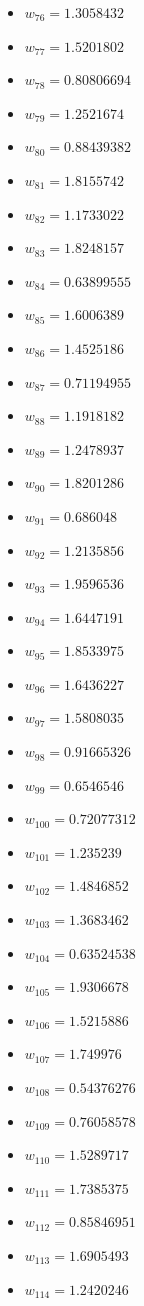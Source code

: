 \documentclass[11pt]{article}
\begin{document}
\begin{itemize}
\item $w_{76} = 1.3058432$
\item $w_{77} = 1.5201802$
\item $w_{78} = 0.80806694$
\item $w_{79} = 1.2521674$
\item $w_{80} = 0.88439382$
\item $w_{81} = 1.8155742$
\item $w_{82} = 1.1733022$
\item $w_{83} = 1.8248157$
\item $w_{84} = 0.63899555$
\item $w_{85} = 1.6006389$
\item $w_{86} = 1.4525186$
\item $w_{87} = 0.71194955$
\item $w_{88} = 1.1918182$
\item $w_{89} = 1.2478937$
\item $w_{90} = 1.8201286$
\item $w_{91} = 0.686048$
\item $w_{92} = 1.2135856$
\item $w_{93} = 1.9596536$
\item $w_{94} = 1.6447191$
\item $w_{95} = 1.8533975$
\item $w_{96} = 1.6436227$
\item $w_{97} = 1.5808035$
\item $w_{98} = 0.91665326$
\item $w_{99} = 0.6546546$
\item $w_{100} = 0.72077312$
\item $w_{101} = 1.235239$
\item $w_{102} = 1.4846852$
\item $w_{103} = 1.3683462$
\item $w_{104} = 0.63524538$
\item $w_{105} = 1.9306678$
\item $w_{106} = 1.5215886$
\item $w_{107} = 1.749976$
\item $w_{108} = 0.54376276$
\item $w_{109} = 0.76058578$
\item $w_{110} = 1.5289717$
\item $w_{111} = 1.7385375$
\item $w_{112} = 0.85846951$
\item $w_{113} = 1.6905493$
\item $w_{114} = 1.2420246$

\end{itemize}
\end{document}
